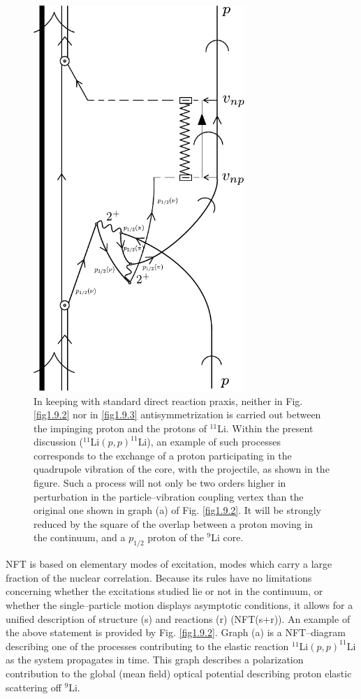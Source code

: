                \begin{figure}
               \centerline {
               \includegraphics*[width=8cm]{introduccion/figs/fig1_9_4}
               }
               \caption{In keeping with standard direct reaction praxis, neither in Fig. \ref{fig1.9.2} nor in
               \ref{fig1.9.3} antisymmetrization is carried out between the impinging proton and the protons
               of $^{11}$Li. Within the present discussion
               ($^{11}$Li$(p,p)^{11}$Li), an example of such processes corresponds to the exchange
               of a proton participating in the quadrupole vibration of the core, with the projectile, as
               shown in the figure. Such a process will not only be two orders higher in perturbation
               in the particle--vibration coupling vertex than the original one shown in graph (a) of Fig. \ref{fig1.9.2}. It will be strongly reduced by the square of
               the overlap between a proton moving in the continuum, and a $p_{1/2}$ proton of the $^{9}$Li
               core.}
               \label{fig1.9.4}
               \end{figure}
          
NFT is based on elementary modes of excitation, modes which carry a large fraction of the nuclear correlation. Because its rules have no limitations concerning whether the excitations studied lie or not in the continuum, or whether the single--particle motion displays asymptotic conditions, it allows for a unified description of structure (s) and reactions (r) (NFT(s+r)). An example of the above statement is provided by Fig. \ref{fig1.9.2}. Graph (a) is a NFT--diagram describing one of the processes contributing to the elastic
reaction $^{11}$Li$(p,p)^{11}$Li as the system propagates in time. This graph describes a polarization contribution to
the global (mean field) optical potential describing proton elastic scattering off $^{9}$Li. 


